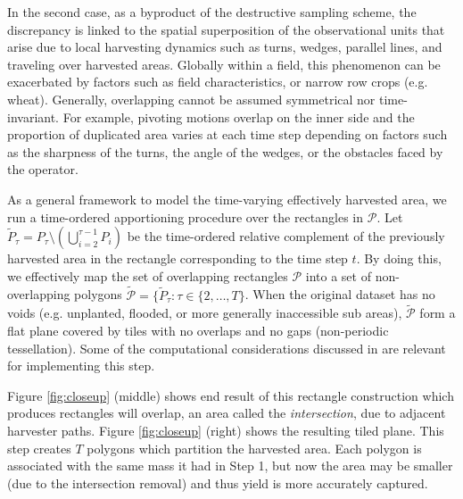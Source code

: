  In the second case, as a byproduct
of the destructive sampling scheme, the discrepancy is linked to the
spatial superposition of the observational units that arise due to
local harvesting dynamics such as turns, wedges, parallel lines, and
traveling over harvested areas. Globally within a field, this
phenomenon can be exacerbated by factors such as field
characteristics, or narrow row crops (e.g. wheat). Generally,
overlapping cannot be assumed symmetrical nor time-invariant. For
example, pivoting motions overlap on the inner side and the proportion
of duplicated area varies at each time step depending on factors such
as the sharpness of the turns, the angle of the wedges, or the
obstacles faced by the operator.

 As a general framework to model the
time-varying effectively harvested area, we run a time-ordered
apportioning procedure over the rectangles in $\mathcal{P}$. Let
$\tilde{P}_\tau = P_\tau \setminus \left( \bigcup_{i = 2}^{\tau - 1}
P_i \right)$ be the time-ordered relative complement of the previously
harvested area in the rectangle corresponding to the time step $t$. By
doing this, we effectively map the set of overlapping rectangles
$\mathcal{P}$ into a set of non-overlapping polygons
$\tilde{\mathcal{P}} = \{\tilde{P}_{\tau}: \tau \in \{2, \dots, T
\}$. When the original dataset has no voids (e.g. unplanted, flooded,
or more generally inaccessible sub areas), $\tilde{\mathcal{P}}$ form
a flat plane covered by tiles with no overlaps and no gaps
(non-periodic tessellation). Some of the computational considerations
discussed in \cite{Drummond1999} are relevant for implementing this
step.

Figure \ref{fig:closeup} (middle) shows end result of this rectangle
construction which produces rectangles will overlap, an area called
the \emph{intersection}, due to adjacent harvester paths. Figure
\ref{fig:closeup} (right) shows the resulting tiled plane. This step
creates $T$ polygons which partition the harvested area. Each polygon
is associated with the same mass it had in Step 1, but now the area
may be smaller (due to the intersection removal) and thus yield is
more accurately captured.

